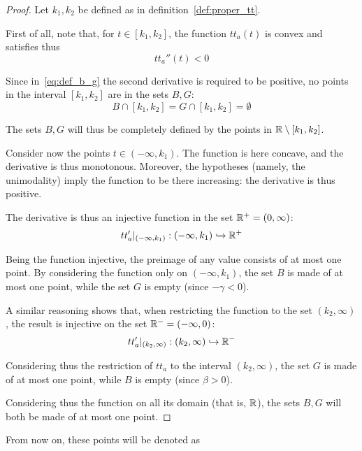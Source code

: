 \begin{proof}
  Let \(k_1, k_2\) be defined as in definition~\ref{def:proper_tt}.

  First of all, note that, for \(t\in[k_1, k_2]\), the function \(tt_a(t)\) is convex and satisfies thus
  \[tt_a''(t) < 0\]

  Since in~\eqref{eq:def_b_g} the second derivative is required to be positive,
  no points in the interval \([k_1, k_2]\) are in the sets \(B, G\):
  \begin{equation*}
    B\cap[k_1, k_2] = G\cap[k_1, k_2] = \emptyset
  \end{equation*}

  The sets \(B, G\) will thus be completely defined by the points in \(\mathbb{R}\setminus[k_1, k_2]\).

  Consider now the points \(t\in(-\infty, k_1)\).
  The function is here concave, and the derivative is thus monotonous.
  Moreover, the hypotheses (namely, the unimodality) imply the function to be there increasing:
  the derivative is thus positive.

  The derivative is thus an injective function in the set \(\mathbb{R}^+ = (0, \infty)\):
  \begin{equation*}
    tt_a'|_{(-\infty, k_1)}:(-\infty, k_1) \xhookrightarrow{} \mathbb{R}^+
  \end{equation*}

  Being the function injective, the preimage of any value consists of at most one point.
  By considering the function only on \((-\infty, k_1)\),
  the set \(B\) is made of at most one point,
  while the set \(G\) is empty (since \(-\gamma < 0\)).

  A similar reasoning shows that, when restricting the function to the set \((k_2, \infty)\),
  the result is injective on the set \(\mathbb{R}^- = (-\infty, 0)\):
  \begin{equation*}
    tt_a'|_{(k_2, \infty)}:(k_2, \infty) \hookrightarrow{} \mathbb{R}^-
  \end{equation*}

  Considering thus the restriction of \(tt_a\) to the interval \((k_2, \infty)\),
  the set \(G\) is made of at most one point,
  while \(B\) is empty (since \(\beta > 0\)).

  Considering thus the function on all its domain (that is, \(\mathbb{R}\)),
  the sets \(B, G\) will both be made of at most one point.

\end{proof}

From now on, these points will be denoted as

